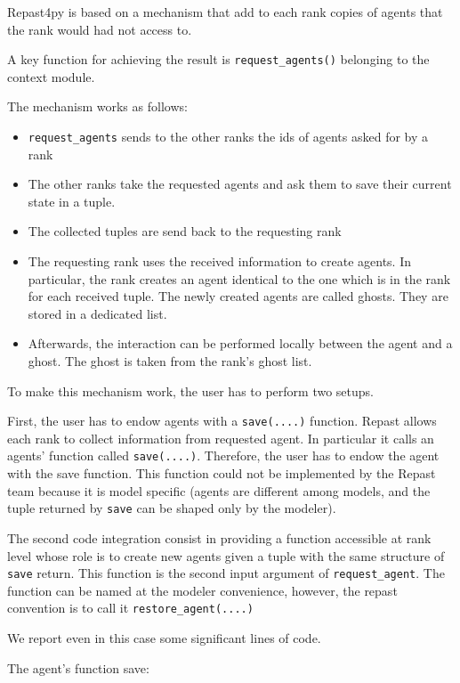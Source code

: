\documentclass{article}
\providecommand{\tightlist}{%
  \setlength{\itemsep}{0pt}\setlength{\parskip}{0pt}}
\begin{document}
Repast4py is based on a mechanism that add to each rank copies of agents that the rank would had not access to.

A key function for achieving the result is \verb+request_agents()+ belonging to the context module.

The mechanism works as follows:

\begin{itemize}
	\tightlist
	\item 
\verb+request_agents+ sends to the other ranks the ids of agents asked for by a rank
	\item 
The other ranks take the requested agents and ask them to save their current state in a tuple.
	\item 
The collected tuples are send back to the requesting rank
	\item 
		The requesting rank uses the received information to create agents. In particular, the rank creates an agent identical to the one which is in the rank for each received tuple. The newly created agents are called ghosts. They are stored in a dedicated list.
	\item 
		Afterwards, the interaction can be performed locally between the agent and a ghost. The ghost is taken from the rank's ghost list.
\end{itemize}

To make this mechanism work, the user has to perform two setups.

First, the user has to endow agents with a \verb+save(....)+ function.
Repast allows each rank to collect information from requested agent. In particular it calls an agents' function called \verb+save(....)+.
Therefore, the user has to endow the agent with the save function. This function could not be implemented by the Repast team because it is model specific (agents are different among models, and the tuple returned by \verb+save+ can be shaped only by the modeler).

The second code integration consist in providing a function accessible at rank level whose role is to create new agents given a tuple with the same structure of \verb+save+ return. This function is the second input argument of \verb+request_agent+. The function can be named at the modeler convenience, however, the repast convention is to call it \verb+restore_agent(....)+   

We report even in this case some significant lines of code.

The agent's function save:
\end{document}
